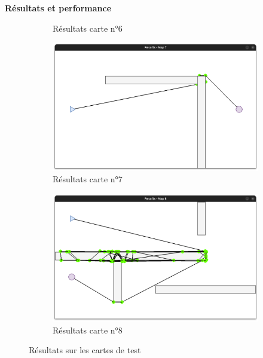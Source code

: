 \documentclass[aspectratio=169,10pt]{beamer}
\begin{document}
\begin{frame}{\textbf{Résultats et performance}}
\begin{figure}[H]
\begin{subfigure}[b]{0.24\textwidth}
			\caption*{Résultats carte n°6}
			\label{fig:rmap6}
		\end{subfigure}
		\hfill
		\begin{subfigure}[b]{0.24\textwidth}
			\centering
			\includegraphics[width=\textwidth]{IMAGES/rmap7.png}
			\caption*{Résultats carte n°7}
			\label{fig:rmap7}
		\end{subfigure}
		\hfill
		\begin{subfigure}[b]{0.24\textwidth}
			\centering
			\includegraphics[width=\textwidth]{IMAGES/rmap8.png}
			\caption*{Résultats carte n°8}
			\label{fig:rmap8}
		\end{subfigure}
		\caption{Résultats sur les cartes de test}
		\label{fig:results_benchmark_maps}
	\end{figure}
\end{frame}
\end{document}

